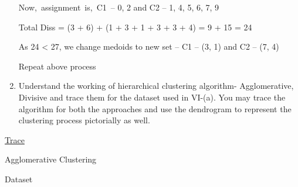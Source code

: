 \documentclass[12pt]{article}
\renewcommand{\_}{\kern-1.5pt\textunderscore\kern-1.5pt}
\begin{document}
\begin{enumerate}
{\fontsize{14pt}{16.8pt}\selectfont Now,\ assignment\ is,\ C1\ – 0, 2     \tab and \tab C2 – 1, 4, 5, 6, 7, 9\par}\par

{\fontsize{14pt}{16.8pt}\selectfont Total Diss = (3 + 6) + (1 + 3 + 1 + 3 + 3 + 4) = 9 + 15 = 24\par}\par

{\fontsize{14pt}{16.8pt}\selectfont As 24 < 27, we change medoids to new set – C1 – (3, 1) and C2 – (7, 4)\par}\par

{\fontsize{14pt}{16.8pt}\selectfont Repeat above process\par}\par


\vspace{\baselineskip}
	\item {\fontsize{14pt}{16.8pt}\selectfont Understand the working of hierarchical clustering algorithm- Agglomerative, Divisive and trace them for the dataset used in VI-(a). You may trace the algorithm for both the approaches and use the dendrogram to represent the clustering process pictorially as well.\par}
\end{enumerate}\par

{\fontsize{14pt}{16.8pt}\selectfont \uline{Trace}\par}\par

{\fontsize{14pt}{16.8pt}\selectfont Agglomerative Clustering\par}\par

{\fontsize{14pt}{16.8pt}\selectfont Dataset\par}\par



\end{document}
